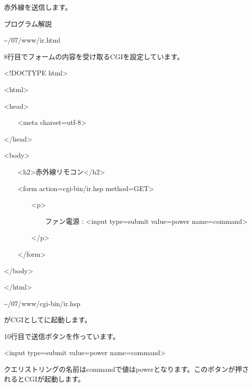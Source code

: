 \documentclass[a4paper,12pt,dvipdfmx]{jarticle}
\begin{document}
赤外線を送信します。


\bigskip

\clearpage
プログラム解説

\~{}/07/www/ir.html

8行目でフォームの内容を受け取るCGIを設定しています。

\centering
\begin{boxedminipage}{0.95\textwidth}
	{\textless}!DOCTYPE html{\textgreater}

		{\textless}html{\textgreater}

	{\textless}head{\textgreater}

	\ \ \ \ {\textless}meta charset={\textquotedbl}utf-8{\textquotedbl}{\textgreater}

	{\textless}/head{\textgreater}

	{\textless}body{\textgreater}

	\ \ \ \ {\textless}h2{\textgreater}赤外線リモコン{\textless}/h2{\textgreater}

	\ \ \ \ {\textless}form action={\textquotedbl}cgi-bin/ir.hsp{\textquotedbl}
	method={\textquotedbl}GET{\textquotedbl}{\textgreater}

	\ \ \ \ \ \ \ \ {\textless}p{\textgreater}

	\ \ \ \ \ \ \ \ \ \ \ \ ファン電源 : {\textless}input type={\textquotedbl}submit{\textquotedbl}
	value={\textquotedbl}power{\textquotedbl} name={\textquotedbl}command{\textquotedbl}{\textgreater}

	\ \ \ \ \ \ \ \ {\textless}/p{\textgreater}

	\ \ \ \ {\textless}/form{\textgreater}

	{\textless}/body{\textgreater}

	{\textless}/html{\textgreater}
\end{boxedminipage}
\flushleft
\~{}/07/www/cgi-bin/ir.hsp

がCGIとしてに起動します。

10行目で送信ボタンを作っています。

{\textless}input type={\textquotedbl}submit{\textquotedbl} value={\textquotedbl}power{\textquotedbl}
name={\textquotedbl}command{\textquotedbl}{\textgreater}

クエリストリングの名前はcommandで値はpowerとなります。このボタンが押されるとCGIが起動します。


\bigskip


\bigskip

\bigskip
\end{document}

